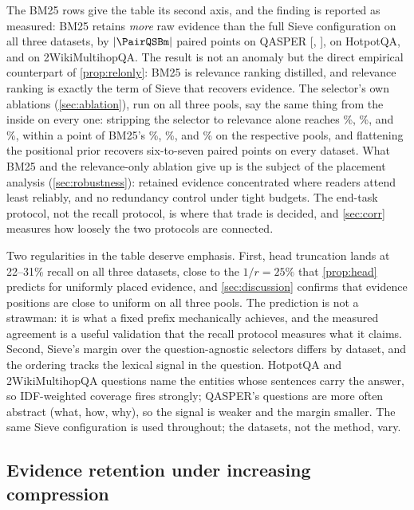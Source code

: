 \documentclass[pdflatex,sn-basic]{sn-jnl}
\DeclarePairedDelimiter\abs{\lvert}{\rvert}
\theoremstyle{remark}
\newcommand{\method}{Sieve}
\begin{document}
The BM25 rows give the table its second axis, and the finding is
reported as measured: BM25 retains \emph{more} raw evidence than the
full \method{} configuration on all three datasets, by
$\abs{\PairQSBm}$ paired points on QASPER [\PairQSBmLo, \PairQSBmHi],
\PairHSBm{} on HotpotQA, and \PairWSBm{} on 2WikiMultihopQA. The
result is not an anomaly but the direct empirical counterpart of
\autoref{prop:relonly}: BM25 is relevance ranking distilled, and
relevance ranking is exactly the term of \method{} that recovers
evidence. The selector's own ablations (\autoref{sec:ablation}), run
on all three pools, say the same thing from the inside on every one:
stripping the selector to relevance alone reaches \AblXQRelOnly\%,
\AblXHRelOnly\%, and \AblXWRelOnly\%, within a point of BM25's
\RecQBm\%, \RecHBm\%, and \RecWBm\% on the respective pools, and
flattening the positional prior recovers six-to-seven paired points on
every dataset. What BM25 and the relevance-only ablation give up
is the subject of the placement analysis (\autoref{sec:robustness}):
retained evidence concentrated where readers attend least reliably,
and no redundancy control under tight budgets. The end-task protocol,
not the recall protocol, is where that trade is decided, and
\autoref{sec:corr} measures how loosely the two protocols are
connected.

Two regularities in the table deserve emphasis. First, head
truncation lands at 22--31\% recall on all three datasets, close to
the $1/r = 25\%$ that \autoref{prop:head} predicts for uniformly
placed evidence, and \autoref{sec:discussion} confirms that evidence
positions are close to uniform on all three pools. The prediction is
not a strawman: it is what a fixed prefix mechanically achieves, and
the measured agreement is a useful validation that the recall protocol
measures what it claims. Second, \method{}'s margin over the
question-agnostic selectors differs by dataset, and the ordering
tracks the lexical signal in the question. HotpotQA and
2WikiMultihopQA questions name the entities whose sentences carry the
answer, so IDF-weighted coverage fires strongly; QASPER's questions
are more often abstract (what, how, why), so the signal is weaker and
the margin smaller. The same \method{} configuration is used
throughout; the datasets, not the method, vary.

\subsection{Evidence retention under increasing compression}
\label{sec:ratio}
\end{document}

